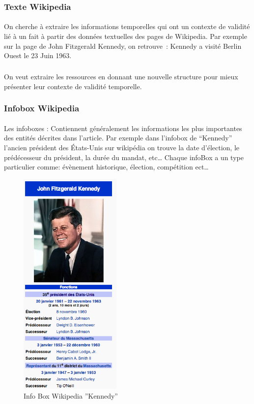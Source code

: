 \subsubsection*{Texte Wikipedia}
\paragraph{}
On cherche à extraire les informations temporelles qui ont un contexte de validité lié à un fait à partir des données textuelles des pages de Wikipedia. 
Par exemple sur la page de John Fitzgerald Kennedy, on retrouve~:
\newline
Kennedy a visité Berlin Ouest le 23 Juin 1963.
\subparagraph{}
On veut extraire les ressources en donnant une nouvelle structure pour mieux présenter leur contexte de validité temporelle.
\subsubsection*{Infobox Wikipedia}
\paragraph{}
Les infoboxes : Contiennent généralement les informations les plus importantes des entités décrites dans l’article. Par exemple dans l’infobox de “Kennedy” l’ancien président des États-Unis sur wikipédia on trouve la date d’élection, le prédécesseur du président, la durée du mandat, etc…
\newline
Chaque infoBox a un type particulier comme: évènement historique, élection, compétition ect…
\begin{figure}[H]
        \centering
                \centering
                \includegraphics[width=5cm]{kennedy.png}
               \caption{Info Box Wikipedia ''Kennedy''}

\end{figure}
